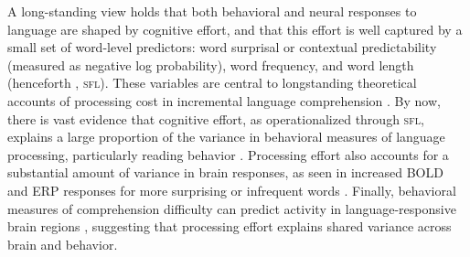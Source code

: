 \documentclass[11pt]{article}
\begin{document}
\smallskip

A long-standing view holds that both behavioral and neural responses to language are shaped by cognitive effort, and that this effort is well captured by a small set of word-level predictors: word surprisal or contextual predictability (measured as negative log probability), word frequency, and word length (henceforth , \textsc{sfl}). These variables are central to longstanding theoretical accounts of processing cost in incremental language comprehension \citep{just1980theory, rayner1996eye, rayner1986lexical, rayner1998eye, clifton2016eye}. By now, there is vast evidence that cognitive effort, as operationalized through \textsc{sfl}, explains a large proportion of the variance in behavioral measures of language processing, particularly reading behavior \citep[e.g.,][]{schilling1998comparing, demberg2008data, effectislogarithmic, berzak2022eye, shain_log}. Processing effort also accounts for a substantial amount of variance in brain responses, as seen in increased BOLD and ERP responses for more surprising or infrequent words \citep[][among others]{federmeier1999rose, n400, delong2005probabilistic, federmeier2007multiple, henderson2016language, brennan2020localizing, shain2020fmri, schmitt2021predicting, heilbron2022hierarchy, russo2022explaining, michaelov2022more, michaelov2023strong, tuckute2023driving}. Finally, behavioral measures of comprehension difficulty can predict activity in language-responsive brain regions \citep{wehbe2021incremental}, suggesting that processing effort explains shared variance across brain and behavior.

\smallskip
\end{document}
